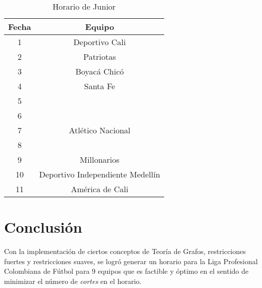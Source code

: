 \documentclass[11pt]{article}
\begin{document}
\begin{multicols}{2}
            \begin{table}[H]
                \centering
                \begin{tabular}{|c||c|}
                    \hline
                    Fecha & Equipo\\ \hline
                    1 & Deportivo Cali\\ \hline
                    2 & Patriotas \\ \hline
                    3 & Boyacá Chicó \\ \hline
                    4 & Santa Fe \\ \hline
                    5 &  \\ \hline
                    6 &  \\ \hline
                    7 & Atlético Nacional \\ \hline
                    8 & \\ \hline
                    9 & Millonarios \\ \hline
                    10 & Deportivo Independiente Medellín \\ \hline
                    11 & América de Cali \\ \hline
                \end{tabular} 
                \caption{Horario de Junior}
            \end{table}
                    
            \section{Conclusión}
            Con la implementación de ciertos conceptos de Teoría de Grafos, restricciones fuertes y restricciones suaves, se logró generar un horario para la Liga Profesional Colombiana de Fútbol para 9 equipos 
            que es factible y óptimo en el sentido de minimizar el número de \textit{cortes} en el horario.
            

\end{multicols}
\end{document}
